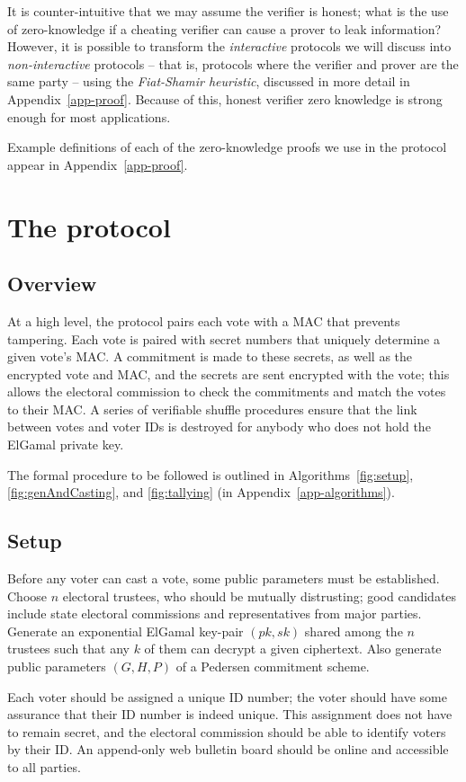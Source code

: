 \documentclass[12pt,a4paper]{article}
\theoremstyle{definition}
\begin{document}
It is counter-intuitive that we may assume the verifier is honest; what is the use of zero-knowledge if a cheating verifier can cause a prover to leak information? However, it is possible to transform the \textit{interactive} protocols we will discuss into \textit{non-interactive} protocols -- that is, protocols where the verifier and prover are the same party -- using the \textit{Fiat-Shamir heuristic}, discussed in more detail in Appendix~\ref{app-proof}. Because of this, honest verifier zero knowledge is strong enough for most applications.

Example definitions of each of the zero-knowledge proofs we use in the protocol appear in Appendix~\ref{app-proof}.

\section{The protocol}\label{sec-protocol}
\subsection{Overview}
At a high level, the protocol pairs each vote with a MAC that prevents tampering. Each vote is paired with secret numbers that uniquely determine a given vote's MAC. A commitment is made to these secrets, as well as the encrypted vote and MAC, and the secrets are sent encrypted with the vote; this allows the electoral commission to check the commitments and match the votes to their MAC. A series of verifiable shuffle procedures ensure that the link between votes and voter IDs is destroyed for anybody who does not hold the ElGamal private key.

The formal procedure to be followed is outlined in Algorithms~\ref{fig:setup}, \ref{fig:genAndCasting}, and \ref{fig:tallying} (in Appendix~\ref{app-algorithms}).
\subsection{Setup}
Before any voter can cast a vote, some public parameters must be established. Choose $n$ electoral trustees, who should be mutually distrusting; good candidates include state electoral commissions and representatives from major parties. Generate an exponential ElGamal key-pair $(pk, sk)$ shared among the $n$ trustees such that any $k$ of them can decrypt a given ciphertext. Also generate public parameters $(G, H, P)$ of a Pedersen commitment scheme.

Each voter should be assigned a unique ID number; the voter should have some assurance that their ID number is indeed unique. This assignment does not have to remain secret, and the electoral commission should be able to identify voters by their ID. An append-only web bulletin board should be online and accessible to all parties.
\end{document}
